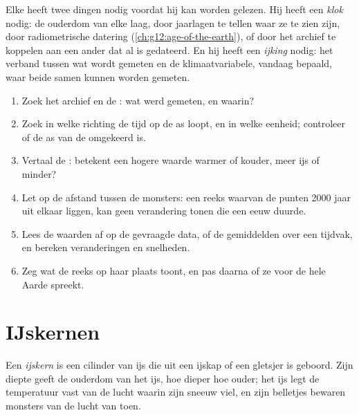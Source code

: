 Elke  heeft twee dingen nodig voordat hij kan worden gelezen. Hij heeft een \emph{klok} nodig:
de ouderdom van elke laag, door jaarlagen te tellen waar ze te zien zijn,
door radiometrische datering (\cref{ch:g12:age-of-the-earth}), of door het
archief te koppelen aan een ander dat al is gedateerd. En hij heeft een \emph{ijking} nodig: het
verband tussen wat wordt gemeten en de klimaatvariabele, vandaag bepaald, waar
beide samen kunnen worden gemeten.

\begin{method}
\begin{enumerate}
  \item Zoek het archief en de : wat werd gemeten, en waarin?
  \item Zoek in welke richting de tijd op de as loopt, en in welke eenheid; controleer
        of de as van de  omgekeerd is.
  \item Vertaal de : betekent een hogere waarde warmer of kouder,
        meer ijs of minder?
  \item Let op de afstand tussen de monsters: een reeks waarvan de punten
        \num{2000} jaar uit elkaar liggen, kan geen verandering tonen die een eeuw duurde.
  \item Lees de waarden af op de gevraagde data, of de gemiddelden over een tijdvak,
        en bereken veranderingen en snelheden.
  \item Zeg wat de reeks op haar plaats toont, en pas daarna of ze
        voor de hele Aarde spreekt.
\end{enumerate}
\end{method}

\section{IJskernen}

\begin{definition}[IJskern]\label{def:g12:past-climates:ice-core}
Een \emph{ijskern} is een cilinder van ijs die uit een ijskap
of een gletsjer is geboord. Zijn diepte geeft de ouderdom van het ijs, hoe dieper hoe ouder;
het ijs legt de temperatuur vast van de lucht waarin zijn sneeuw viel, en zijn
belletjes bewaren monsters van de lucht van toen.
\end{definition}

